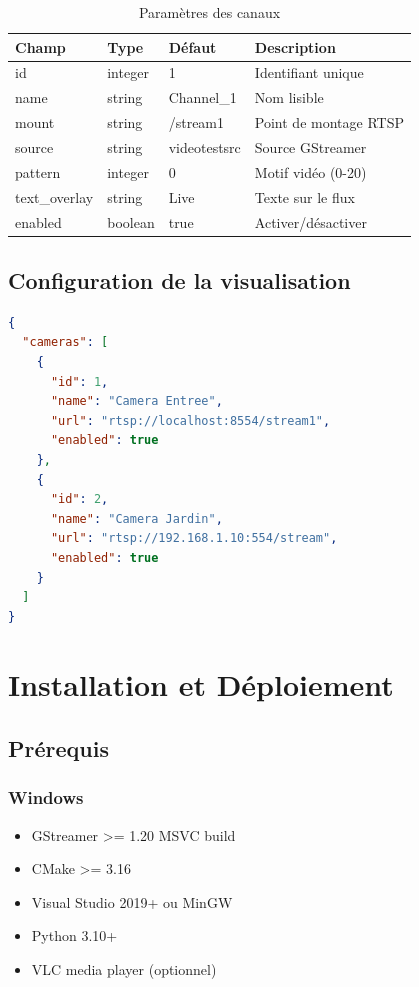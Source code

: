 \documentclass[12pt,a4paper]{report}
\begin{document}
\begin{table}[H]
    \centering
    \caption{Paramètres des canaux}
    \label{tab:params}
    \begin{tabular}{|l|l|l|l|}
        \hline
        \textbf{Champ} & \textbf{Type} & \textbf{Défaut} & \textbf{Description} \\
        \hline
        id & integer & 1 & Identifiant unique \\
        name & string & Channel\_1 & Nom lisible \\
        mount & string & /stream1 & Point de montage RTSP \\
        source & string & videotestsrc & Source GStreamer \\
        pattern & integer & 0 & Motif vidéo (0-20) \\
        text\_overlay & string & Live & Texte sur le flux \\
        enabled & boolean & true & Activer/désactiver \\
        \hline
    \end{tabular}
\end{table}

\section{Configuration de la visualisation}

\begin{lstlisting}[language=json, caption=cameras.json]
{
  "cameras": [
    {
      "id": 1,
      "name": "Camera Entree",
      "url": "rtsp://localhost:8554/stream1",
      "enabled": true
    },
    {
      "id": 2,
      "name": "Camera Jardin",
      "url": "rtsp://192.168.1.10:554/stream",
      "enabled": true
    }
  ]
}
\end{lstlisting}

\chapter{Installation et Déploiement}

\section{Prérequis}

\subsection{Windows}
\begin{itemize}
    \item GStreamer >= 1.20 MSVC build
    \item CMake >= 3.16
    \item Visual Studio 2019+ ou MinGW
    \item Python 3.10+
    \item VLC media player (optionnel)
\end{itemize}
\end{document}
